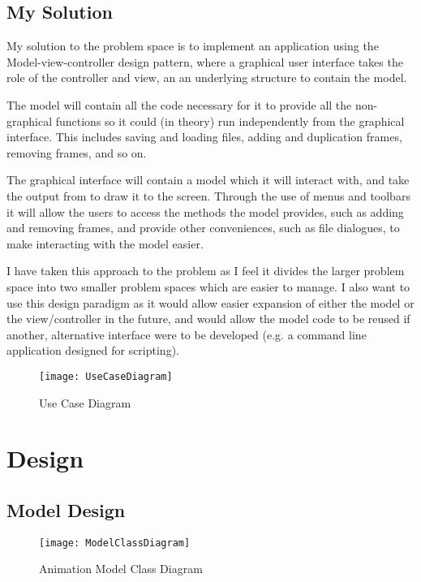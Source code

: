 \documentclass[a4paper, 11pt]{article}
\begin{document}
\subsection{My Solution}

My solution to the problem space is to implement an application using the Model-view-controller design pattern, where a graphical user interface takes the role of the controller and view, an an underlying structure to contain the model.

The model will contain all the code necessary for it to provide all the non-graphical functions so it could (in theory) run independently from the graphical interface. This includes saving and loading files, adding and duplication frames, removing frames, and so on.

The graphical interface will contain a model which it will interact with, and take the output from to draw it to the screen. Through the use of menus and toolbars it will allow the users to access the methods the model provides, such as adding and removing frames, and provide other conveniences, such as file dialogues, to make interacting with the model easier.

I have taken this approach to the problem as I feel it divides the larger problem space into two smaller problem spaces which are easier to manage. I also want to use this design paradigm as it would allow easier expansion of either the model or the view/controller in the future, and would allow the model code to be reused if another, alternative interface were to be developed (e.g. a command line application designed for scripting).

\begin{figure}[H]
\centering
\texttt{[image: UseCaseDiagram]}
\caption{Use Case Diagram}
\label{UseCaseDiagram}
\end{figure}


\newpage

\section{Design}

\subsection{Model Design}

\begin{figure}[H]
\centering
\texttt{[image: ModelClassDiagram]}
\caption{Animation Model Class Diagram}
\label{ModelClassDiagram}
\end{figure}
\end{document}
